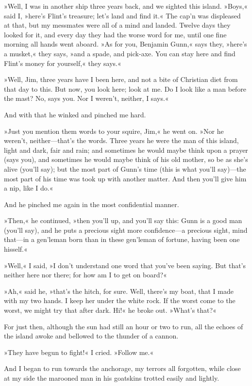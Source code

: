 »Well, I was in another ship three years back, and we sighted this island. »Boys,« said I, »here's Flint's treasure; let's land and find it.« The cap'n was displeased at that, but my messmates were all of a mind and landed. Twelve days they looked for it, and every day they had the worse word for me, until one fine morning all hands went aboard. »As for you, Benjamin Gunn,« says they, »here's a musket,« they says, »and a spade, and pick-axe. You can stay here and find Flint's money for yourself,« they says.«

»Well, Jim, three years have I been here, and not a bite of Christian diet from that day to this. But now, you look here; look at me. Do I look like a man before the mast? No, says you. Nor I weren't, neither, I says.«

And with that he winked and pinched me hard.

»Just you mention them words to your squire, Jim,« he went on. »Nor he weren't, neither—that's the words. Three years he were the man of this island, light and dark, fair and rain; and sometimes he would maybe think upon a prayer (says you), and sometimes he would maybe think of his old mother, so be as she's alive (you'll say); but the most part of Gunn's time (this is what you'll say)—the most part of his time was took up with another matter. And then you'll give him a nip, like I do.«

And he pinched me again in the most confidential manner.

»Then,« he continued, »then you'll up, and you'll say this: Gunn is a good man (you'll say), and he puts a precious sight more confidence—a precious sight, mind that—in a gen'leman born than in these gen'leman of fortune, having been one hisself.«

»Well,« I said, »I don't understand one word that you've been saying. But that's neither here nor there; for how am I to get on board?«

»Ah,« said he, »that's the hitch, for sure. Well, there's my boat, that I made with my two hands. I keep her under the white rock. If the worst come to the worst, we might try that after dark. Hi!« he broke out. »What's that?«

For just then, although the sun had still an hour or two to run, all the echoes of the island awoke and bellowed to the thunder of a cannon.

»They have begun to fight!« I cried. »Follow me.«

And I began to run towards the anchorage, my terrors all forgotten, while close at my side the marooned man in his goatskins trotted easily and lightly.

